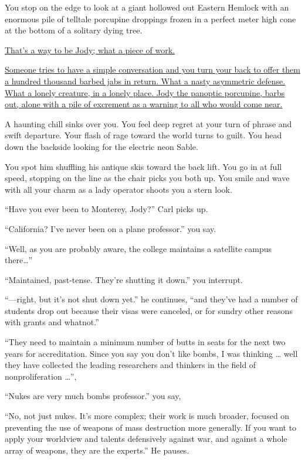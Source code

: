 \documentclass[17pt, twoside, a5paper, openright, extrafontsizes]{memoir}
\renewcommand{\emph}[1]{\ul{#1}}
\begin{document}
You stop on the edge to look at a giant hollowed out Eastern Hemlock
with an enormous pile of telltale porcupine droppings frozen in a
perfect meter high cone at the bottom of a solitary dying tree.

\emph{That's a way to be Jody; what a piece of work.}

\emph{Someone tries to have a simple conversation and you turn your back
to offer them a hundred thousand barbed jabs in return. What a nasty
asymmetric defense. What a lonely creature, in a lonely place. Jody the
panoptic porcupine, barbs out, alone with a pile of excrement as a
warning to all who would come near.}

A haunting chill sinks over you. You feel deep regret at your turn of
phrase and swift departure. Your flash of rage toward the world turns to
guilt. You head down the backside looking for the electric neon Sable.

You spot him shuffling his antique skis toward the back lift. You go in
at full speed, stopping on the line as the chair picks you both up. You
smile and wave with all your charm as a lady operator shoots you a stern
look.

``Have you ever been to Monterey, Jody?'' Carl picks up.

``California? I've never been on a plane professor.'' you say.

``Well, as you are probably aware, the college maintains a satellite
campus there\ldots{}''

``Maintained, past-tense. They're shutting it down.'' you interrupt.

``---right, but it's not shut down yet.'' he continues, ``and they've
had a number of students drop out because their visas were canceled, or
for sundry other reasons with grants and whatnot.''

``They need to maintain a minimum number of butts in seats for the next
two years for accreditation. Since you say you don't like bombs, I was
thinking \ldots{} well they have collected the leading researchers and
thinkers in the field of nonproliferation \ldots{}'',

``Nukes are very much bombs professor.'' you say,

``No, not just nukes. It's more complex; their work is much broader,
focused on preventing the use of weapons of mass destruction more
generally. If you want to apply your worldview and talents defensively
against war, and against a whole array of weapons, they are the
experts.'' He pauses.
\end{document}
